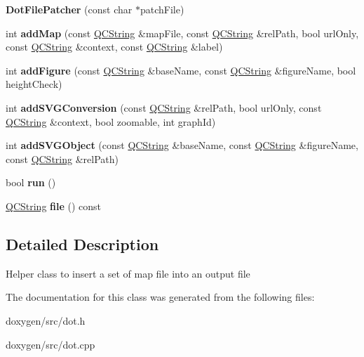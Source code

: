 \begin{DoxyCompactItemize}
\item 
\mbox{\label{class_dot_file_patcher_aaf02acecacecc1482f18bfaf154ec3aa}} 
{\bfseries Dot\+File\+Patcher} (const char $\ast$patch\+File)
\item 
\mbox{\label{class_dot_file_patcher_aa53ad66e5d0c6a04f6d198aa030b63f3}} 
int {\bfseries add\+Map} (const \mbox{\hyperlink{class_q_c_string}{Q\+C\+String}} \&map\+File, const \mbox{\hyperlink{class_q_c_string}{Q\+C\+String}} \&rel\+Path, bool url\+Only, const \mbox{\hyperlink{class_q_c_string}{Q\+C\+String}} \&context, const \mbox{\hyperlink{class_q_c_string}{Q\+C\+String}} \&label)
\item 
\mbox{\label{class_dot_file_patcher_af67aa4441f3e872f6d3c69667572c052}} 
int {\bfseries add\+Figure} (const \mbox{\hyperlink{class_q_c_string}{Q\+C\+String}} \&base\+Name, const \mbox{\hyperlink{class_q_c_string}{Q\+C\+String}} \&figure\+Name, bool height\+Check)
\item 
\mbox{\label{class_dot_file_patcher_aac97171a3985fd07e09fef2a25819a16}} 
int {\bfseries add\+S\+V\+G\+Conversion} (const \mbox{\hyperlink{class_q_c_string}{Q\+C\+String}} \&rel\+Path, bool url\+Only, const \mbox{\hyperlink{class_q_c_string}{Q\+C\+String}} \&context, bool zoomable, int graph\+Id)
\item 
\mbox{\label{class_dot_file_patcher_a8a0183f93570ac3b1a8df3e0f7229a2b}} 
int {\bfseries add\+S\+V\+G\+Object} (const \mbox{\hyperlink{class_q_c_string}{Q\+C\+String}} \&base\+Name, const \mbox{\hyperlink{class_q_c_string}{Q\+C\+String}} \&figure\+Name, const \mbox{\hyperlink{class_q_c_string}{Q\+C\+String}} \&rel\+Path)
\item 
\mbox{\label{class_dot_file_patcher_a659e502ffc3ddcf46e1f53820ee5926e}} 
bool {\bfseries run} ()
\item 
\mbox{\label{class_dot_file_patcher_aeaa352fd44a4ec3b40b0e5d5dea85d80}} 
\mbox{\hyperlink{class_q_c_string}{Q\+C\+String}} {\bfseries file} () const
\end{DoxyCompactItemize}


\subsection{Detailed Description}
Helper class to insert a set of map file into an output file 

The documentation for this class was generated from the following files\+:\begin{DoxyCompactItemize}
\item 
doxygen/src/dot.\+h\item 
doxygen/src/dot.\+cpp\end{DoxyCompactItemize}
